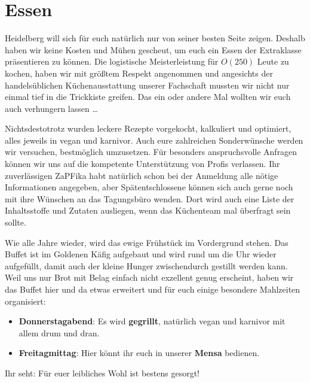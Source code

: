 
\section{Essen}
Heidelberg will sich für euch natürlich nur von seiner besten Seite zeigen. Deshalb haben wir keine Kosten und Mühen gescheut,  um euch ein Essen der Extraklasse präsentieren zu können. Die logistische Meisterleistung für $O(250)$ Leute zu kochen, haben wir mit größtem Respekt angenommen und angesichts der handelsüblichen Küchenausstattung unserer Fachschaft mussten wir nicht nur einmal tief in die Trickkiste greifen. Das ein oder andere Mal wollten wir euch auch verhungern lassen \dots

Nichtsdestotrotz wurden leckere Rezepte vorgekocht, kalkuliert und optimiert, alles jeweils in vegan und karnivor.  Auch eure zahlreichen Sonderwünsche werden wir versuchen, bestmöglich umzusetzen. Für besonders anspruchsvolle Anfragen können wir uns auf die kompetente Unterstützung von Profis verlassen. Ihr zuverlässigen ZaPFika habt natürlich schon bei der Anmeldung alle nötige Informationen angegeben, aber Spätentschlossene können sich auch gerne noch mit ihre Wünschen an das Tagungsbüro wenden. Dort wird auch eine Liste der Inhaltsstoffe und Zutaten ausliegen, wenn das Küchenteam mal überfragt sein sollte.

Wie alle Jahre wieder, wird das ewige Frühstück im Vordergrund stehen. Das Buffet ist im Goldenen Käfig aufgebaut und wird rund um die Uhr wieder aufgefüllt, damit auch der kleine Hunger zwischendurch gestillt werden kann. Weil uns nur Brot mit Belag einfach nicht exzellent genug erscheint, haben wir das Buffet hier und da etwas erweitert und für euch einige besondere Mahlzeiten organisiert:
  \begin{itemize}    
    \item \textbf{Donnerstagabend}: Es wird \textbf{gegrillt}, natürlich vegan und karnivor mit allem drum und dran.
    \item \textbf{Freitagmittag}: Hier könnt ihr euch in unserer \textbf{Mensa} bedienen.
  \end{itemize}
  Ihr seht: Für euer leibliches Wohl ist bestens gesorgt! \\

